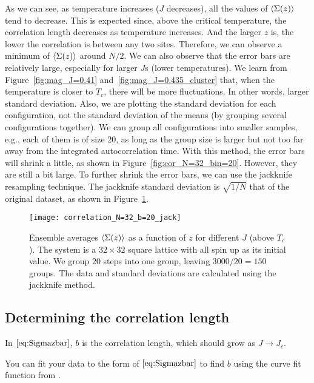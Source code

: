 As we can see, as temperature increases (\(J\) decreases), all the values of
\(\expval{\Sigma(z)}\) tend to decrease.
This is expected since, above the critical temperature, the correlation length
decreases as temperature increases.
And the larger \(z\) is, the lower the correlation is between any two sites.
Therefore, we can observe a minimum of \(\expval{\Sigma(z)}\) around \(N / 2\).
We can also observe that the error bars are relatively large, especially for
larger \(J\)s (lower temperatures).
We learn from Figure~\ref{fig:mag_J=0.41} and~\ref{fig:mag_J=0.435_cluster}
that, when the temperature is closer to \(T_c\), there will be more fluctuations.
In other words, larger standard deviation.
Also, we are plotting the standard deviation for each configuration,
not the standard deviation of the means (by grouping several configurations together).
We can group all configurations into smaller samples, e.g., each of them
is of size \(20\), as long as the group size is larger but not too far away from
the integrated autocorrelation time. With this method, the error bars will shrink
a little, as shown in Figure~\ref{fig:cor_N=32_bin=20}.
However, they are still a bit large. To further shrink the error bars,
we can use the jackknife resampling technique.
The jackknife standard deviation is \(\sqrt{1 / N}\) that of the original dataset,
as shown in Figure~\ref{fig:cor_N=32_bin=20_jack}.

\begin{figure}
    \centering
    \texttt{[image: correlation\_N=32\_b=20\_jack]}
    \caption{Ensemble averages \(\expval{\Sigma(z)}\) as a function of \(z\) for different
        \(J\) (above \(T_c\)). The system is a \(32 \times 32\) square lattice
        with all spin up as its initial value.
        We group \(20\) steps into one group, leaving \(3000 / 20 = 150\) groups.
        The data and standard deviations are calculated using the jackknife method.}
    \label{fig:cor_N=32_bin=20_jack}
\end{figure}

\subsection{Determining the correlation length}

In \(\eqref{eq:Sigmazbar}\), \(b\) is the correlation length, which should grow as
\(J \rightarrow J_c\).

\Question{} You can fit your data to the form of \(\eqref{eq:Sigmazbar}\) to find \(b\)
using the curve fit function  from
\href{https://github.com/JuliaNLSolvers/LsqFit.jl}{}.

